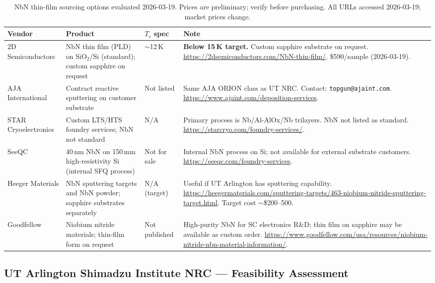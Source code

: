 \begin{table}[ht]
\centering
\caption{NbN thin-film sourcing options evaluated 2026-03-19. Prices are preliminary;
  verify before purchasing.
  All URLs accessed 2026-03-19; market prices change.}
\label{tab:nbn_vendors}
\small
\begin{tabular}{@{}p{2.5cm}p{3cm}p{1.8cm}p{6cm}@{}}
\toprule
Vendor & Product & $T_c$ spec & Note \\
\midrule
2D Semiconductors & NbN thin film (PLD) on SiO$_2$/Si (standard); custom sapphire on request &
  $\sim$12\,K &
  \textbf{Below 15\,K target.} Custom sapphire substrate on request.
  \url{https://2dsemiconductors.com/NbN-thin-film/}. \$590/sample (2026-03-19). \\[4pt]
AJA International & Contract reactive sputtering on customer substrate &
  Not listed &
  Same AJA ORION class as UT NRC. Contact: \texttt{topgun@ajaint.com}.
  \url{https://www.ajaint.com/deposition-services}. \\[4pt]
STAR Cryoelectronics & Custom LTS/HTS foundry services; NbN not standard &
  N/A &
  Primary process is Nb/Al-AlOx/Nb trilayers. NbN not listed as standard.
  \url{https://starcryo.com/foundry-services/}. \\[4pt]
SeeQC & 40\,nm NbN on 150\,mm high-resistivity Si (internal SFQ process) &
  Not for sale &
  Internal NbN process on Si; not available for external substrate customers.
  \url{https://seeqc.com/foundry-services}. \\[4pt]
Heeger Materials & NbN sputtering targets and NbN powder; sapphire substrates separately &
  N/A (target) &
  Useful if UT Arlington has sputtering capability.
  \url{https://heegermaterials.com/sputtering-targets/463-niobium-nitride-sputtering-target.html}.
  Target cost $\sim$\$200--500. \\[4pt]
Goodfellow & Niobium nitride materials; thin-film form on request &
  Not published &
  High-purity NbN for SC electronics R\&D; thin film on sapphire may be available as custom order.
  \url{https://www.goodfellow.com/usa/resources/niobium-nitride-nbn-material-information/}. \\
\bottomrule
\end{tabular}
\end{table}

\subsection{UT Arlington Shimadzu Institute NRC --- Feasibility Assessment}
\label{sec:nbn_nrc}

